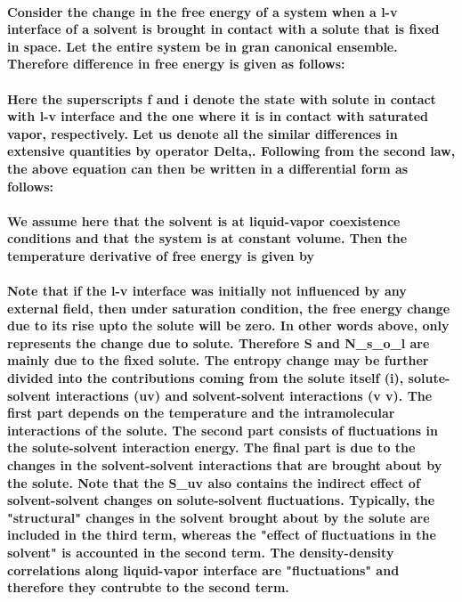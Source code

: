 \documentclass[a4paper,12pt,single,pdftex]{scrartcl}
\begin{document}
{\label{ID_106467715}\paragraph{Consider the change in the free energy of a system when a l-v interface of a solvent is brought in contact with a solute that is fixed in space. Let the entire system be in gran canonical ensemble. Therefore difference in free energy is given as follows:}

\label{ID_1903608681}\paragraph{Here the superscripts f and i denote the state with solute in contact with l-v interface and the one where it is in contact with saturated vapor, respectively. Let us denote all the similar differences in extensive quantities by operator Delta,. Following from the second law, the above equation can then be written in a differential form as follows:}

\label{ID_1377597507}\paragraph{We assume here that the solvent is at liquid-vapor coexistence conditions and that the system is at constant volume. Then the temperature derivative of free energy is given by}

\label{ID_863437212}\paragraph{Note that if the l-v interface was initially not influenced by any external field, then under saturation condition, the free energy change due to its rise upto the solute will be zero. In other words \Delta \mu above, only represents the change due to solute. Therefore \Delta S and \Delta N_s_o_l are mainly due to the fixed solute. The entropy change may be further divided into the contributions coming from the solute itself (i), solute-solvent interactions (uv) and solvent-solvent interactions (v v). The first part depends on the temperature and the intramolecular interactions of the solute. The second part consists of fluctuations in the solute-solvent interaction energy. The final part is due to the changes in the solvent-solvent interactions that are brought about by the solute. Note that the \Delta S_{uv} also contains the indirect effect of solvent-solvent changes on solute-solvent fluctuations. Typically, the "structural" changes in the solvent brought about by the solute are included in the third term, whereas the "effect of fluctuations in the solvent" is accounted in the second term. The density-density correlations along liquid-vapor interface are "fluctuations" and therefore they contrubte to the second term.}

}
\end{document}
